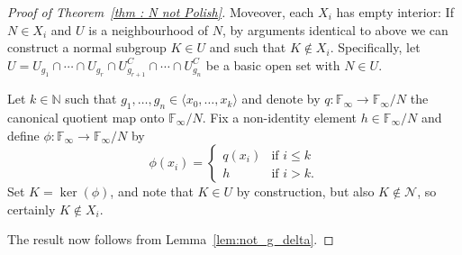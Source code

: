 \documentclass[10pt,a4paper]{amsart}
\begin{document}
\begin{proof}[Proof of Theorem~\ref{thm : N not Polish}]
Moveover, each $X_i$ has empty interior:  If $N \in X_i$ and $U$ is a neighbourhood of $N$, by arguments identical to above we can construct a normal subgroup $K \in U$ and such that $K \notin X_i$.  Specifically,  let \(U= U_{g_1}\cap \dotsb \cap U_{g_r}\cap U^C_{g_{r+1}}\cap \dotsb\cap U^C_{g_n}\) be a basic open set with \(N \in U\).

    Let \(k\in \mathbb{N}\) such that \(g_1,\dotsc, g_n\in \langle x_0,\dotsc, x_k \rangle \) and denote by \(q\colon \mathbb{F}_\infty \to \mathbb{F}_\infty/N\) the canonical quotient map onto \(\mathbb{F}_\infty/N\). Fix a non-identity element $h \in \mathbb{F}_{\infty}/N$ and define $\phi \colon \mathbb{F}_{\infty} \rightarrow \mathbb{F}_{\infty}/N$ by 
    \[
\phi(x_i) =
\begin{cases}
    q(x_i) &\text{if $i \leq k$}\\
    h &\text{if $i>k$.} 
\end{cases}
\]
Set $K = \ker(\phi)$, and note that $K \in U$ by construction, but also $K \notin \mathcal{N}$, so certainly $K \notin X_i$.

The result now follows from Lemma~\ref{lem:not_g_delta}.
\end{proof}
\end{document}
